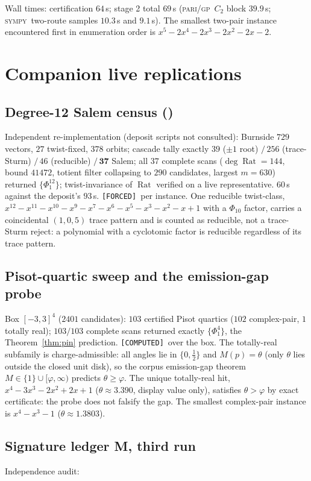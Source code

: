 \documentclass[11pt]{article}
\newcommand{\F}{\textnormal{\texttt{[FORCED]}}}
\newcommand{\C}{\textnormal{\texttt{[COMPUTED]}}}
\newcommand{\Rat}{\operatorname{Rat}}
\newcommand{\gp}{\textsc{pari/gp}}
\newcommand{\sy}{\textsc{sympy}}
\theoremstyle{definition}
\begin{document}
Wall times: certification $64$\,s; stage 2 total $69$\,s (\gp\ $C_2$ block
$39.9$\,s; \sy\ two-route samples $10.3$\,s and $9.1$\,s). The smallest two-pair
instance encountered first in enumeration order is
$x^5-2x^4-2x^3-2x^2-2x-2$.

\section{Companion live replications}\label{sec:companions}

\subsection{Degree-12 Salem census (\cite[Thm.~7.10]{relcharge})}
Independent re-implementation (deposit scripts not consulted): Burnside
$729$ vectors, $27$ twist-fixed, $378$ orbits; cascade tally exactly
$39$ ($\pm1$ root) $/\,256$ (trace-Sturm) $/\,46$ (reducible) $/\,\mathbf{37}$
Salem; all $37$ complete scans ($\deg\Rat=144$, bound $41472$, totient filter
collapsing to $290$ candidates, largest $m=630$) returned $\{\Phi_1^{12}\}$;
twist-invariance of $\Rat$ verified on a live representative. $60$\,s against
the deposit's $93$\,s. \F\ per instance. One reducible twist-class,
$x^{12}-x^{11}-x^{10}-x^{9}-x^{7}-x^{6}-x^{5}-x^{3}-x^{2}-x+1$ with a $\Phi_{10}$
factor, carries a coincidental $(1,0,5)$ trace pattern and is counted as
reducible, not a trace-Sturm reject: a polynomial with a cyclotomic factor is
reducible regardless of its trace pattern.

\subsection{Pisot-quartic sweep and the emission-gap probe}
Box $[-3,3]^4$ ($2401$ candidates): $103$ certified Pisot quartics
($102$ complex-pair, $1$ totally real); $103/103$ complete scans returned
exactly $\{\Phi_1^4\}$, the Theorem~\ref{thm:pin} prediction. \C\ over the box.
The totally-real subfamily is charge-admissible: all angles lie in
$\{0,\tfrac12\}$ and $M(p)=\theta$ (only $\theta$ lies outside the closed unit
disk), so the corpus emission-gap theorem
$M\in\{1\}\cup[\varphi,\infty)$ predicts $\theta\ge\varphi$. The unique
totally-real hit, $x^4-3x^3-2x^2+2x+1$ ($\theta\approx3.390$, display value
only), satisfies $\theta>\varphi$ by exact certificate: the probe does not
falsify the gap. The smallest complex-pair instance is $x^4-x^3-1$
($\theta\approx1.3803$).

\subsection{Signature ledger M, third run}\label{sec:ledgerM}
Independence audit:
\end{document}
